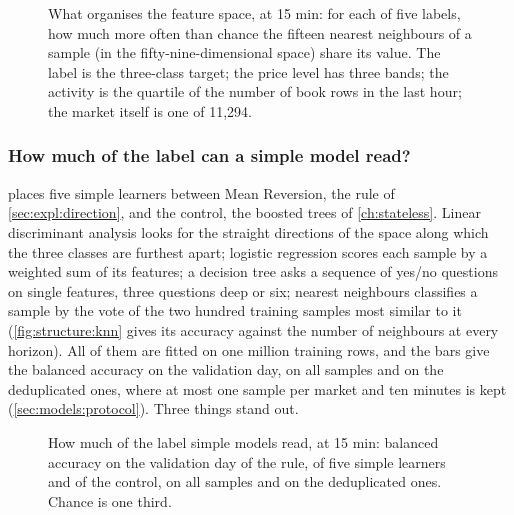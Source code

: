 \begin{figure}[t]
\centering

\caption{What organises the feature space, at 15 min: for each of five labels, how much
more often than chance the fifteen nearest neighbours of a sample (in the
fifty-nine-dimensional space) share its value.  The label is the three-class target; the
price level has three bands; the activity is the quartile of the number of book rows in
the last hour; the market itself is one of 11{,}294.}
\label{fig:structure:lift}
\end{figure}

\subsubsection{How much of the label can a simple model read?}
\label{sec:structure:sep}

 places five simple learners between Mean Reversion, the rule of
\cref{sec:expl:direction}, and the control, the boosted trees of \cref{ch:stateless}.
Linear discriminant analysis looks for the straight directions of the space along which
the three classes are furthest apart; logistic regression scores each sample by a weighted
sum of its features; a decision tree asks a sequence of yes/no questions on single
features, three questions deep or six; nearest neighbours classifies a sample by the vote
of the two hundred training samples most similar to it (\cref{fig:structure:knn} gives its
accuracy against the number of neighbours at every horizon).  All of them are fitted on one
million training rows, and the bars give the balanced accuracy on the validation day, on
all samples and on the deduplicated ones, where at most one sample per market and ten
minutes is kept (\cref{sec:models:protocol}).  Three things stand out.

\begin{figure}[t]
\centering

\caption{How much of the label simple models read, at 15 min: balanced accuracy on the
validation day of the rule, of five simple learners and of the control, on all samples and
on the deduplicated ones.  Chance is one third.}
\label{fig:structure:sep}
\end{figure}

